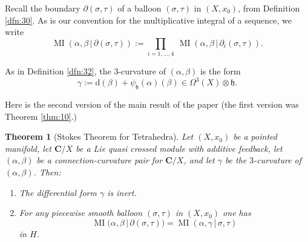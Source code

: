 \documentclass[10pt, a4paper]{amsart}
\newtheorem{thm}[equation]{Theorem}
\theoremstyle{definition}
\numberwithin{equation}{section}
\newcommand{\opn}{\operatorname}
\newcommand{\mfrak}[1]{\mathfrak{#1}}
\newcommand{\mbf}[1]{\mathbf{#1}}
\newcommand{\mrm}[1]{\mathrm{#1}}
\renewcommand{\vert}{\, | \,}
\newcommand{\h}{\mfrak{h}}
\renewcommand{\d}{\mrm{d}}
\begin{document}
Recall the boundary $\partial (\sigma, \tau)$ of a balloon 
$(\sigma, \tau)$ in $(X, x_0)$, from Definition \ref{dfn:30}.
As is our convention for the multiplicative integral of a sequence, we write
\[ \opn{MI}(\alpha, \beta \vert \partial (\sigma, \tau)) :=
\prod_{i = 1, \ldots, 4} \ 
\opn{MI}(\alpha, \beta \vert \partial_i(\sigma, \tau) ) . \]

As in Definition \ref{dfn:32}, the $3$-curvature of $(\alpha, \beta)$ is
the form
\[ \gamma := \d(\beta) + \psi_{\h}(\alpha)(\beta) \in 
\Omega^3(X) \otimes \h . \]

Here is the second version of the main result of the paper (the first version
was Theorem \ref{thm:10}.)

\begin{thm}[Stokes Theorem for Tetrahedra] \label{thm:22}
Let $(X, x_0)$ be a pointed manifold, let
$\mbf{C} / X$ be a Lie quasi crossed module with additive feedback, 
let $(\alpha, \beta)$ be a connection-curvature pair for 
$\mbf{C} / X$, and let $\gamma$ be the $3$-curvature of $(\alpha, \beta)$.
Then:
\begin{enumerate}
\item The differential form $\gamma$ is inert. 
\item For any piecewise smooth balloon $(\sigma, \tau)$ in $(X, x_0)$ one has
\[  \opn{MI} \bigl( \alpha, \beta \vert \partial (\sigma, \tau)
\bigr) = 
\opn{MI} (\alpha, \gamma \vert \sigma, \tau)  \]
in $H$.
\end{enumerate}
\end{thm}
\end{document}
